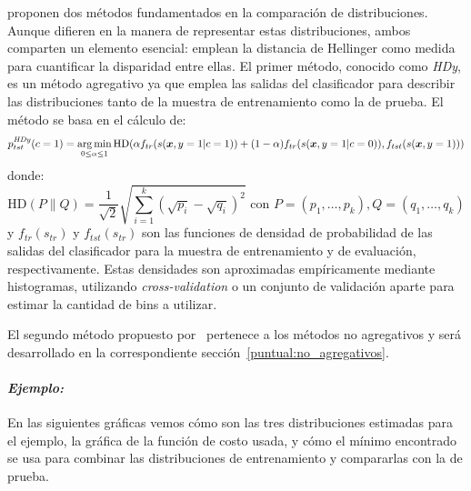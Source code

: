 \citet{gonzalez2013class} proponen dos métodos fundamentados en la comparación
de distribuciones. Aunque difieren en la manera de representar estas
distribuciones, ambos comparten un elemento esencial: emplean la distancia de
Hellinger como medida para cuantificar la disparidad entre ellas. El primer
método, conocido como {\it HDy}, es un método agregativo ya que emplea las
salidas del clasificador para describir las distribuciones tanto de la muestra
de entrenamiento como la de prueba. El método se basa en el cálculo de:
\begin{equation}\label{ecuacion:hdy}
    p^{\it HDy \/}_{tst}(c=1) = \operatorname*{arg\,min}_{0 \leq \alpha \leq 1}{\text{HD}}(\alpha f_{tr}{(s(\boldsymbol{x},y=1|c=1))}+(1-\alpha) f_{tr}{(s(\boldsymbol{x},y=1|c=0))}, f_{tst}{(s(\boldsymbol{x},y=1))})
\end{equation}
donde:
\begin{equation}\label{ecuacion:hd}
    {\text{HD}}(P \parallel Q)= \frac{1}{\sqrt{2}}{\sqrt {\sum _{i=1}^{k}{({\sqrt {p_{i}}}-{\sqrt {q_{i}}})}^{2}}} \text{ con } P=(p_1,\dots,p_k), Q=(q_1,\dots,q_k)
\end{equation}
y $f_{tr}(s_{tr})$ y $f_{tst}(s_{tr})$ son las funciones de densidad de
probabilidad de las salidas del clasificador para la muestra de entrenamiento y
de evaluación, respectivamente. Estas densidades son aproximadas empíricamente
mediante histogramas, utilizando {\it cross-validation\/} o un conjunto de
validación aparte para estimar la cantidad de bins a utilizar.

El segundo método propuesto por~\citet{gonzalez2013class} pertenece a los
métodos no agregativos y será desarrollado en la correspondiente
sección~\ref{puntual:no_agregativos}.

\paragraph{\it Ejemplo:\/} En las siguientes gráficas vemos cómo son las tres
distribuciones estimadas para el ejemplo, la gráfica de la función de costo
usada, y cómo el mínimo encontrado se usa para combinar las distribuciones de
entrenamiento y compararlas con la de prueba.

